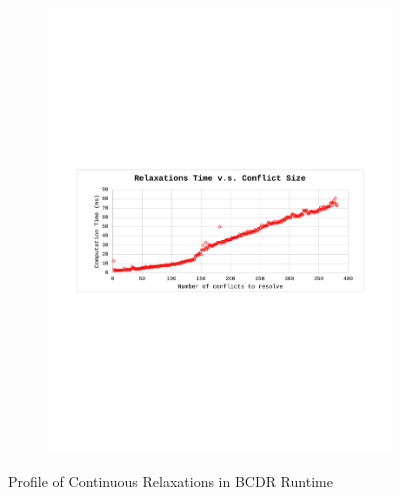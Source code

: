 \documentclass[jair,twoside,11pt,theapa]{article}
\begin{document}
\begin{figure}[!ht]
\begin{subfigure}[b]{0.8\textwidth}
		\includegraphics[width=\textwidth,trim={2.6cm 10.2cm 2.4cm 10.3cm},clip]{figures/BunchConflict/relaxation_time_nobunch.pdf}
		\caption{}
		\label{fig:cont_relaxation_time}
	\end{subfigure}
	\caption{Profile of Continuous Relaxations in BCDR Runtime}
	\label{fig:conflict_resolution_time_1}
\end{figure}
\end{document}
